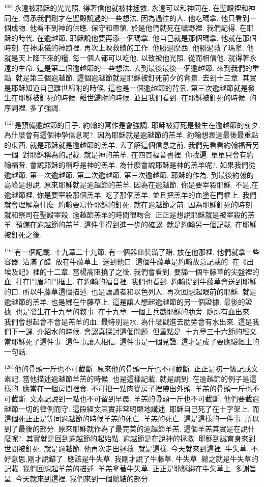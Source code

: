 \documentclass{book}
\begin{document}
$^{1081}$永遠被耶穌的光光照.
得著信他就被神拯救.
永遠可以和神同在.
在聖殿裡和神同在.
傳承我們剛才在聖殿說過的一些想法.
因為過往的人.
他吃瑪拿.
他只看到一個成物.
他看不到神的供應.
保守和帶領.
於是他們就死在曠野裡.
我們記得.
在耶穌的時代.
在逾越節.
耶穌說他要再添一個瑪拿.
他自己就是那個瑪拿.
他就在那個時刻.
在神秉儀的神蹟裡.
再次上映救贖的工作.
他勝過摩西.
他勝過救了瑪拿.
他就是天上降下來的糧.
每一個人都可以吃他.
以致被他光照.
從而相信他.
就得著永遠的生命.
這是第二個逾越節的一些想法.
去到最後最後一個逾越節.
來到我們的重點.
就是第三個逾越節.
這個逾越節就是耶穌被釘死前夕的背景.
去到十三章.
其實是耶穌知道自己離世歸附的時候.
這也是一個逾越節的背景.
第三次逾越節就是發生在耶穌被釘死的時候.
離世歸附的時候.
並且我們看到.
在耶穌被釘死的時候.
的序詞裡.
多了強調.

$^{1121}$是預備逾越節的日子.
約翰的寫作是會強調.
耶穌被釘死是發生在逾越節的前夕.
為什麼會有這個神學信息呢?.
因為耶穌就是逾越節的羔羊.
約翰想表達最後最重點的東西.
就是耶穌就是逾越節的羔羊.
去了解這個信息之前.
我們先看看約翰福音另一個.
對耶穌稱為的記載.
就是神的羔羊.
在四貫福音書裡.
你找遍.
單單只會有約翰福音.
會說耶穌的稱呼是神的羔羊.
為什麼會說耶穌是神的羔羊呢?.
如果我們從逾越節.
第一次逾越節.
第二次逾越節.
第三次逾越節.
耶穌的作為.
到最後約翰的高峰是想說.
原來耶穌就是逾越節的羔羊.
因為在逾越節.
你是要宰殺耶穌.
不是,在逾越節裡.
你是要宰殺那個羔羊.
吃了那個羔羊.
並且把羔羊的血塗在門框上.
我們就會理解為什麼.
約翰要寫作耶穌的釘死.
就在逾越節之前.
因為耶穌釘死的時刻.
就和祭司在聖殿宰殺.
逾越節羔羊的時間很吻合.
正正是想說耶穌就是被宰殺的羔羊.
預備在逾越節的羔羊.
這件事得到進一步的確認.
就是約翰另一個記載.
在耶穌被釘死之後.

$^{1161}$有一個記載.
十九章二十九節.
有一個器皿裝滿了醋.
放在他那裡.
他們就拿一些容器.
沾滿了醋.
放在牛藤草上.
送到他口.
這個牛藤草是約翰故意記載的.
在《出埃及記》裡的十二章.
當楊高阻撓了之後.
我們會看到.
要舔一個牛藤草的尖盤裡的血.
打在門眉和門框上.
在約翰的福音裡.
我們也看到.
約翰提到牛藤草會送到耶穌的口.
所以牛藤草這個描述.
也是讓讀者和以色列人.
再次回想起眼前的耶穌.
就是逾越節的羔羊.
也是綁在牛藤草上.
這是讓人想起逾越節的另一個證據.
最後的證據.
也是發生在十九章的敘事.
在十九章.
一個士兵戳耶穌的肋旁.
隨即有血出來.
我們會想起會不會是羔羊的血.
最特別是水.
為什麼戳進去肋旁會有水出來.
這是我們下一課.
介紹水的時候.
會認真探討這個問題.
但重點是.
十九章三十六節的經文.
當耶穌死了這件事.
這件事讓人相信.
這件事是一個見證.
這才是成了要應驗經上的一句話.

$^{1201}$他的骨頭一斤也不可截斷.
原來他的骨頭一斤也不可截斷.
正正是初一級記或文素記.
當他描述逾越節羊羔的時候.
也是這樣記載.
就是說到.
在逾越節的例子是這樣的.
應當在一個房間裡食.
不可把一點肉從房子裡帶出外頭.
羊羔的骨頭一斤也不可截斷.
文素記說到一點也不可留到早晨.
羊羔的骨頭一斤也不可截斷.
他們要截逾越節一切的律例而守.
這段經文其實非常明顯地講述.
耶穌自己死了在十字架上.
而這個死正正是等同逾越節的時候羊羔的死亡.
羊羔的死亡.
這是這樣的一件事.
所以到了最後的部分.
原來耶穌就作為了最完美的逾越節羊羔.
這個羊羔其實是在說什麼呢?.
其實就是回到逾越節的起始點.
逾越節是在說神的拯救.
耶穌到誠育身來到世間被釘死.
就是逾越節.
他再次走出拯救.
就是這樣.
今天就來到這裡.
牛失草.
不好意思,剛才說錯了.
應該是牛失草.
我剛才說了牛藤草.
牛失草.
總之就是牛失草的記載.
我們回想起羊羔的描述.
羊羔拿著牛失草.
正正是耶穌綁在牛失草上.
多謝旨呈.
今天就來到這裡.
我們來到一個總結的部分.
\end{document}
